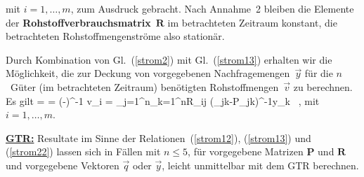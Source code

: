 %
\be
{}
\ee
%
mit $i = 1, \ldots, m$, zum Ausdruck gebracht. Nach Annahme~2
bleiben die Elemente der
{\bf Rohstoffverbrauchsmatrix}~$\mathbf{R}$ im betrachteten
Zeitraum konstant, die betrachteten Rohstoffmengenstr\"{o}me also 
station\"{a}r.

\medskip
\noindent
Durch Kombination von Gl.~(\ref{strom2}) mit Gl.~(\ref{strom13})
erhalten wir die M\"oglichkeit, die zur Deckung von vorgegebenen
Nachfragemengen~$\vec{y}$ f\"ur die $n$~G\"uter (im betrachteten
Zeitraum) ben\"otigten Rohstoffmengen~$\vec{v}$ zu berechnen. Es
gilt
%
\be
{}
 = 
= (-)^{-1}
\quad\Leftrightarrow\quad
v_{i} = \sum_{j=1}^{n}\sum_{k=1}^{n}R_{ij}
(\delta_{jk}-P_{jk})^{-1}y_{k} \ ,
\ee
%
mit $i = 1, \ldots, m$.

\medskip
\noindent
\underline{\bf GTR:} Resultate im Sinne der
Relationen~(\ref{strom12}), (\ref{strom13}) und (\ref{strom22})
lassen sich in F\"allen mit $n \leq 5$, f\"ur vorgegebene
Matrizen $\mathbf{P}$ und $\mathbf{R}$ und vorgegebene Vektoren
$\vec{q}$ oder $\vec{y}$, leicht unmittelbar mit dem GTR berechnen.

